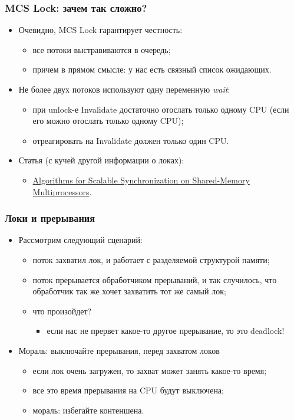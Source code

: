 \begin{frame}
\frametitle{MCS Lock: зачем так сложно?}
\begin{itemize}
  \item Очевидно, MCS Lock гарантирует честность:
  \begin{itemize}
    \item все потоки выстравиваются в очередь;
    \item причем в прямом смысле: у нас есть связный список ожидающих.
  \end{itemize}
  \item Не более двух потоков используют одну переменную \emph{wait}:
  \begin{itemize}
    \item при unlock-е Invalidate достаточно отослать только одному CPU (если
    его можно отослать только одному CPU);
    \item отреагировать на Invalidate должен только один CPU.
  \end{itemize}
  \item Статья (с кучей другой информации о локах):
  \begin{itemize}
    \item \href{https://www.cs.rice.edu/~johnmc/papers/tocs91.pdf}{Algorithms
    for Scalable Synchronization on Shared-Memory Multiprocessors}.
  \end{itemize}
\end{itemize}
\end{frame}

\begin{frame}
\frametitle{Локи и прерывания}
\begin{itemize}
  \item Рассмотрим следующий сценарий:
  \begin{itemize}
    \item поток захватил лок, и работает с разделяемой структурой памяти;
    \item поток прерывается обработчиком прерываний, и так случилось, что
    обработчик так же хочет захватить тот же самый лок;
    \item что произойдет?
    \begin{itemize}
      \item если нас не прервет какое-то другое прерывание, то это deadlock!
    \end{itemize}
  \end{itemize}
  \item Мораль: выключайте прерывания, перед захватом локов
  \begin{itemize}
    \item если лок очень загружен, то захват может занять какое-то время;
    \item все это время прерывания на CPU будут выключена;
    \item мораль: избегайте контеншена.
  \end{itemize}
\end{itemize}
\end{frame}

